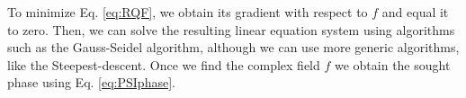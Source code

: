 To minimize Eq. \eqref{eq:RQF}, we obtain its gradient with respect to $f$ and
equal it to zero. Then, we can solve the resulting linear equation system using
algorithms such as the Gauss-Seidel algorithm, although we can use more generic 
algorithms, like the Steepest-descent. Once we find the complex field $f$ we 
obtain the sought phase using Eq. \eqref{eq:PSIphase}.
